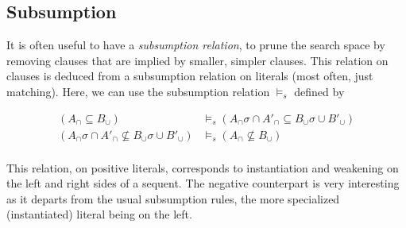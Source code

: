 \documentclass{article}
\begin{document}
\subsection{Subsumption}
It is often useful to have a \emph{subsumption relation}, to prune the search
space by removing clauses that are implied by smaller, simpler clauses. This
relation on clauses is deduced from a subsumption relation on literals (most
often, just matching). Here, we can use the subsumption relation $\models_s$ defined
by

\begin{align*}
(A_\cap \subseteq B_\cup) &\models_s
    (A_\cap\sigma \cap A'_\cap \subseteq B_\cup\sigma \cup B'_\cup) \\
(A_\cap\sigma \cap A'_\cap \not\subseteq B_\cup\sigma \cup B'_\cup) &\models_s
    (A_\cap \not\subseteq B_\cup) \\
\end{align*}

This relation, on positive literals, corresponds to instantiation and
weakening on the left and right sides of a sequent. The negative counterpart
is very interesting as it departs from the usual subsumption rules, the
more specialized (instantiated) literal being on the left.

\end{document}
